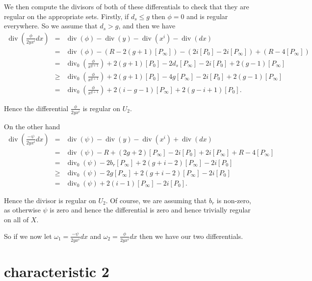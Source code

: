 \documentclass[draft, 11pt]{article} %
\theoremstyle{plain}
\theoremstyle{remark}
\DeclareMathOperator{\di}{div}
\begin{document}
We then compute the divisors of both of these differentials to check that they are regular on the appropriate sets.
Firstly, if $d_s \leq g$ then $\phi = 0$ and is regular everywhere.
So we assume that $d_s > g$, and then we have
\begin{eqnarray*}
\di\left( \frac{\phi}{2yx^i}dx \right) & = & \di(\phi) -\di(y) - \di(x^i) - \di (dx) \\
& = & \di(\phi) - ( R - 2(g+1)[P_\infty]) - (2i[P_0] - 2i[P_\infty]) + (R - 4[P_\infty]) \\
& = & \di_0\left( \frac{\phi}{x^{g+1}}\right) + 2(g+1)[P_0] - 2d_s[P_\infty] - 2i[P_0] + 2(g-1)[P_\infty] \\
& \geq & \di_0\left( \frac{\phi}{x^{g+1}}\right) + 2(g+1)[P_0] - 4g[P_\infty] - 2i[P_0] + 2(g-1)[P_\infty] \\
& = & \di_0\left( \frac{\phi}{x^{g+1}} \right) + 2(i-g-1)[P_\infty] + 2(g-i+1)[P_0].
\end{eqnarray*}

Hence the differential $\frac{\phi}{2yx^i}$ is regular on $U_2$.

On the other hand
\begin{eqnarray*}
\di \left( \frac{-\psi}{2yx^i}dx\right) & = & \di(\psi) - \di(y) - \di(x^i) + \di (dx) \\
& = & \di (\psi ) -R + (2g+2)[P_\infty] - 2i[P_0] + 2i[P_\infty] + R -4[P_\infty] \\
& =  & \di_0(\psi) - 2b_r[P_\infty] + 2(g+i-2)[P_\infty] -2i[P_0] \\
& \geq & \di_0(\psi) - 2g[P_\infty] + 2(g+i-2)[P_\infty] -2i[P_0] \\
& = & \di_0(\psi) + 2(i-1)[P_\infty] - 2i[P_0].
\end{eqnarray*}

Hence the divisor is regular on $U_2$. 
Of course, we are assuming that $b_r$ is non-zero, as otherwise $\psi$ is zero and hence the differential is zero and hence trivially regular on all of $X$.


So if we now let $\omega_1 = \frac{-\psi}{2yx^i}dx$ and $\omega_2 = \frac{\phi}{2yx^i}dx$ then we have our two differentials.

\newpage

\section{characteristic 2}
\end{document}
